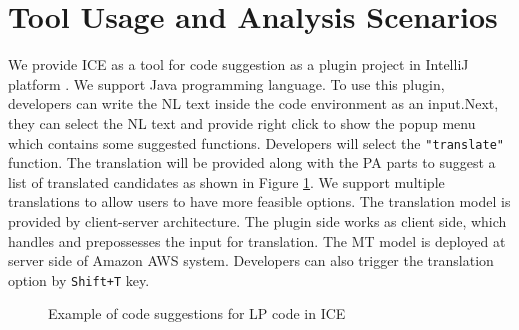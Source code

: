 \documentclass[sigconf,review]{acmart}
\begin{document}
\section{Tool Usage and Analysis Scenarios}
We provide ICE as a tool for code suggestion as a plugin project in IntelliJ platform \cite{041}. We support Java programming language. To use this plugin, developers can write the NL text inside the code environment as an input.Next, they can select the NL text and provide right click to show the popup menu which contains some suggested functions. Developers will select the \texttt{"translate"} function. The translation will be provided along with the PA parts to suggest a list of translated candidates as shown in Figure \ref{figExample1}. We support multiple translations to allow users to have more feasible options. The translation model is provided by client-server architecture. The plugin side works as client side, which handles and prepossesses the input for translation. The MT model is deployed at server side of Amazon AWS system. Developers can also trigger the translation option by \texttt{Shift+T} key.

\begin{figure}
        \caption{Example of code suggestions for LP code in ICE}
        \label{figExample1} 
\end{figure}
\end{document}
